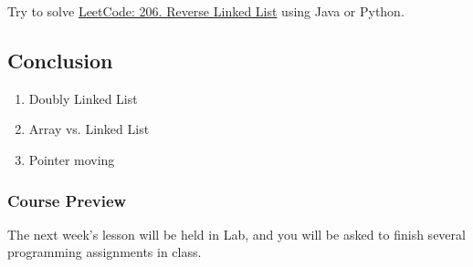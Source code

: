 \documentclass[aspectratio=169, 14pt]{beamer}
\begin{document}
\begin{frame}

	{\large {}} Try to solve \href{https://leetcode.com/problems/reverse-linked-list/}{LeetCode: 206. Reverse Linked List} using Java or Python.

\end{frame}

\begin{frame}

	\section{\textcolor{darkmidnightblue}{Conclusion}}
	\begin{enumerate}
		\item Doubly Linked List
		\item Array vs. Linked List
		\item Pointer moving
	\end{enumerate}
\end{frame}

\begin{frame}
	\frametitle{Course Preview}
	{\large {}} The next week's lesson will be held in Lab, and you will be asked to finish several programming assignments in class.

\end{frame}
\end{document}

